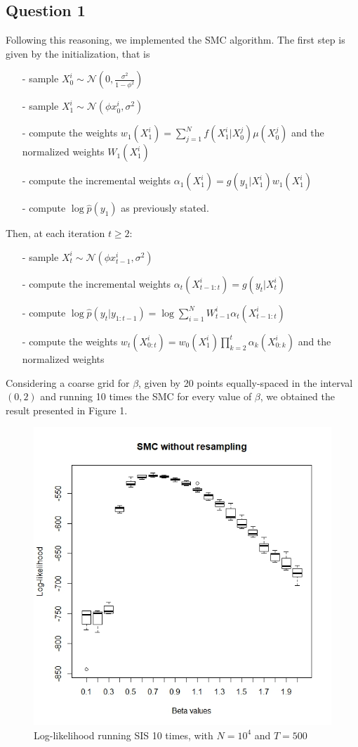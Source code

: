 \documentclass[]{article}
\begin{document}
	\subsection*{Question 1}
	Following this reasoning, we implemented the SMC algorithm. The first step is given by the initialization, that is 
	\begin{enumerate}
		\item[-] sample $X_0^i \sim \mathcal{N}(0, \frac{\sigma^2}{1-\phi^2})$
		\item[-] sample $X_1^i \sim \mathcal{N}(\phi x_0^i,\sigma^2) $ 
		\item[-] compute the weights $w_1(X_1^i) = \sum_{j=1}^{N}f(X_1^i|X_0^j)\mu(X_0^j)$ and the normalized weights $W_1(X_1^i)$
		\item[-] compute the incremental weights $ \alpha_1(X_1^i) = g(y_1|X_1^i)w_1(X_1^i) $
		\item[-] compute $\log \hat{p}(y_1)$ as previously stated. 
	\end{enumerate}
	Then, at each iteration $t \geq 2$:
	\begin{enumerate}
		\item[-] sample $X_t^i \sim \mathcal{N}(\phi x_{t-1}^i,\sigma^2) $
		\item[-] compute the incremental weights $ \alpha_t(X_{t-1:t}^i) = g(y_t|X_t^i) $
		\item[-] compute $\log \hat{p}(y_t|y_{1:t-1})=\log\sum_{i=1}^{N}W_{t-1}^i\alpha_t(X_{t-1:t}^i)$
		\item[-] compute the weights $
		w_t(X_{0:t}^i)=w_0(X_1^i)\prod_{k=2}^{t}\alpha_k(X_{0:k}^i)$ and the normalized weights
	\end{enumerate}
	Considering a coarse grid for $\beta$, given by 20 points equally-spaced in the interval $(0,2)$ and running 10 times the SMC for every value of $\beta$, we obtained the result presented in Figure 1. 
	\begin{figure}
		\includegraphics[width=\columnwidth]{task1/SIS_N_10000_T_500.jpeg}
		\caption{Log-likelihood running SIS 10 times, with $N=10^4$ and $T=500$}
	\end{figure}
\end{document}
